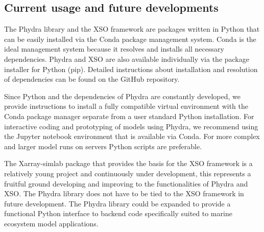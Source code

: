 \documentclass[journal abbreviation, manuscript]{copernicus}
\begin{document}




\subsection{Current usage and future developments}
The Phydra library and the XSO framework are packages written in Python that can be easily installed via the Conda package management system. Conda is the ideal management system because it resolves and installs all necessary dependencies. Phydra and XSO are also available individually via the package installer for Python (pip). Detailed instructions about installation and resolution of dependencies can be found on the GitHub repository.

Since Python and the dependencies of Phydra are constantly developed, we provide instructions to install a fully compatible virtual environment with the Conda package manager separate from a user standard Python installation. For interactive coding and prototyping of models using Phydra, we recommend using the Jupyter notebook environment that is available via Conda. For more complex and larger model runs on servers Python scripts are preferable.

The Xarray-simlab package that provides the basis for the XSO framework is a relatively young project and continuously under development, this represents a fruitful ground developing and improving to the functionalities of Phydra and XSO. The Phydra library does not have to be tied to the XSO framework in future development. The Phydra library could be expanded to provide a functional Python interface to backend code specifically suited to marine ecosystem model applications.
\end{document}
